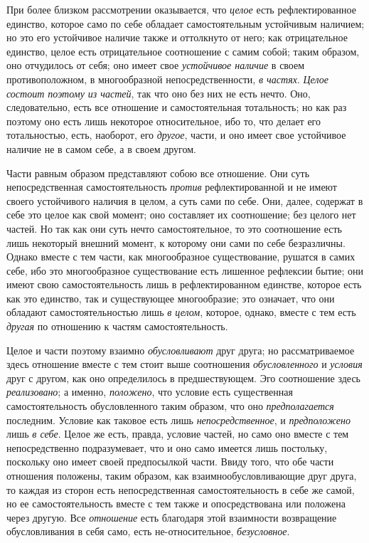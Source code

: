 При более близком рассмотрении оказывается, что
{\em целое} есть рефлектированное единство, которое
само по себе обладает самостоятельным устойчивым наличием; но это его
устойчивое наличие также и оттолкнуто от него; как отрицательное единство,
целое есть отрицательное соотношение с самим собой; таким образом, оно
отчудилось от себя; оно имеет свое {\em устойчивое
наличие} в своем противоположном, в многообразной непосредственности,
{\em в частях}. {\em Целое состоит
поэтому из частей}, так что оно без них не есть нечто. Оно, следовательно,
есть все отношение и самостоятельная тотальность; но как раз поэтому оно
есть лишь некоторое относительное, ибо то, что делает его тотальностью,
есть, наоборот, его {\em другое}, части, и оно имеет
свое устойчивое наличие не в самом себе, а в своем другом.

Части равным образом представляют собою все отношение. Они суть
непосредственная самостоятельность {\em против}
рефлектированной и не имеют своего устойчивого наличия в целом, а суть сами
по себе. Они, далее, содержат в себе это целое как свой момент; оно
составляет их соотношение; без целого нет частей. Но так как они суть нечто
самостоятельное, то это соотношение есть лишь некоторый внешний момент, к
которому они сами по себе безразличны. Однако вместе с тем части, как
многообразное существование, рушатся в самих себе, ибо это многообразное
существование есть лишенное рефлексии бытие; они имеют свою
самостоятельность лишь в рефлектированном единстве, которое есть как это
единство, так и существующее многообразие; это означает, что они обладают
самостоятельностью лишь {\em в целом}, которое, однако,
вместе с тем есть {\em другая} по отношению к частям
самостоятельность.

Целое и части поэтому взаимно {\em обусловливают} друг
друга; но рассматриваемое здесь отношение вместе с тем стоит выше
соотношения {\em обусловленного} и
{\em условия} друг с другом, как оно определилось в
предшествующем. Эго соотношение здесь
{\em реализовано}; а именно,
{\em положено}, что условие есть существенная
самостоятельность обусловленного таким образом, что оно
{\em предполагается} последним. Условие как таковое
есть лишь {\em непосредственное}, и
{\em предположено} лишь {\em в
себе}. Целое же есть, правда, условие частей, но само оно вместе с тем
непосредственно подразумевает, что и оно само имеется лишь постольку,
поскольку оно имеет своей предпосылкой части. Ввиду того, что обе части
отношения положены, таким образом, как взаимнообусловливающие друг друга,
то каждая из сторон есть непосредственная самостоятельность в себе же
самой, но ее самостоятельность вместе с тем также и опосредствована или
положена через другую. Все {\em отношение} есть
благодаря этой взаимности возвращение обусловливания в себя само, есть
не-относительное, {\em безусловное}.

